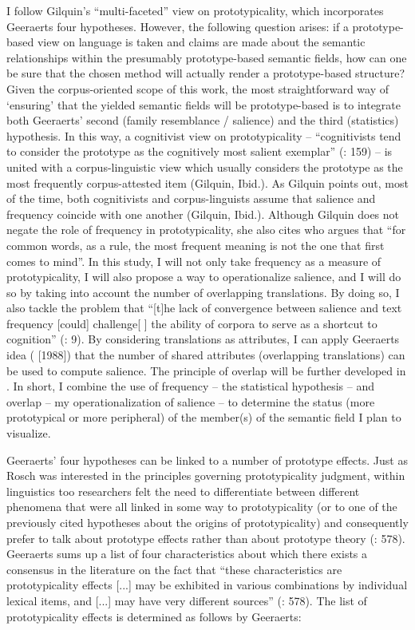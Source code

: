 I follow Gilquin’s “multi-faceted” view on prototypicality, which incorporates Geeraerts four hypotheses. However, the following question arises: if a prototype-based view on language is taken and claims are made about the semantic relationships within the presumably prototype-based semantic fields, how can one be sure that the chosen method will actually render a prototype-based structure? Given the corpus-oriented scope of this work, the most straightforward way of ‘ensuring’ that the yielded semantic fields will be prototype-based is to integrate both Geeraerts’ second (family resemblance / salience) and the third (statistics) hypothesis. In this way, a cognitivist view on prototypicality – “cognitivists tend to consider the prototype as the cognitively most salient exemplar” (\citealt{gilquin_place_2006}: 159) – is united with a corpus-linguistic view which usually considers the prototype as the most frequently corpus-attested item (Gilquin, Ibid.). As Gilquin points out, most of the time, both cognitivists and corpus-linguists assume that salience and frequency coincide with one another (Gilquin, Ibid.). Although Gilquin does not negate the role of frequency in prototypicality, she also cites \citet[36]{sinclair_corpus_1991} who argues that “for common words, as a rule, the most frequent meaning is not the one that first comes to mind”. In this study, I will not only take frequency as a measure of prototypicality, I will also propose a way to operationalize salience, and I will do so by taking into account the number of overlapping translations. By doing so, I also tackle the problem that “[t]he lack of convergence between salience and text frequency [could] challenge[ ] the ability of corpora to serve as a shortcut to cognition” (\citealt{arppe_cognitive_2010}: 9). By considering translations as attributes, I can apply Geeraerts idea (\citeyear[29]{geeraerts_where_2006} [1988]) that the number of shared attributes (overlapping translations) can be used to compute salience. The principle of overlap will be further developed in . In short, I combine the use of frequency – the statistical hypothesis – and overlap – my operationalization of salience – to determine the status (more prototypical or more peripheral) of the member(s) of the semantic field I plan to visualize.



Geeraerts’ four hypotheses can be linked to a number of prototype effects. Just as Rosch was interested in the principles governing prototypicality judgment, within linguistics too researchers felt the need to differentiate between different phenomena that were all linked in some way to prototypicality (or to one of the previously cited hypotheses about the origins of prototypicality) and consequently prefer to talk about prototype effects rather than about prototype theory (\citealt{allan_lexical_2013}: 578). Geeraerts sums up a list of four characteristics about which there exists a consensus in the literature on the fact that “these characteristics are prototypicality effects [...] may be exhibited in various combinations by individual lexical items, and [...] may have very different sources” (\citealt{allan_lexical_2013}: 578). The list of prototypicality effects is determined as follows by Geeraerts:


